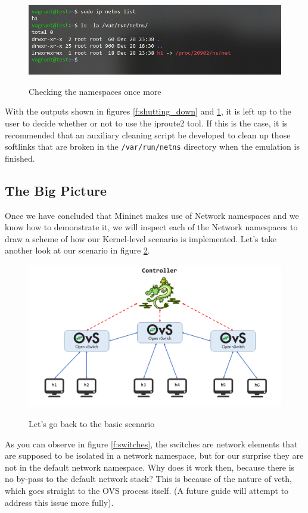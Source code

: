 \documentclass[12pt]{article}
\newcommand{\newpar} {
    \vskip 1cm
}
\begin{document}
			\begin{figure}
				\centering
				\includegraphics[width=\linewidth]{broken_softlink.png}
				\label{f:broken_softlink}
				\caption{Checking the namespaces once more}
			\end{figure}

			With the outputs shown in figures \ref{f:shutting_down} and \ref{f:broken_softlink}, it is left up to the user to decide whether or not to use the iproute2 tool. If this is the case, it is recommended that an auxiliary cleaning script be developed to clean up those softlinks that are broken in the \texttt{/var/run/netns} directory when the emulation is finished.
            \newpar
            
	\subsection{The Big Picture}
		Once we have concluded that Mininet makes use of Network namespaces and we know how to demonstrate it, we will inspect each of the Network namespaces to draw a scheme of how our Kernel-level scenario is implemented. Let's take another look at our scenario in figure \ref{f:scenario_prime}.
        \newpage
		\begin{figure}[!htb]
			\centering
			\includegraphics[width=0.8\linewidth]{scenario.png}
			\label{f:scenario_prime}
			\caption{Let's go back to the basic scenario}
		\end{figure}
        
		As you can observe in figure \ref{f:switches}, the switches are network elements that are supposed to be isolated in a network namespace, but for our surprise they are not in the default network namespace. Why does it work then, because there is no by-pass to the default network stack? This is because of the nature of veth, which goes straight to the OVS process itself. (A future guide will attempt to address this issue more fully).
\end{document}
